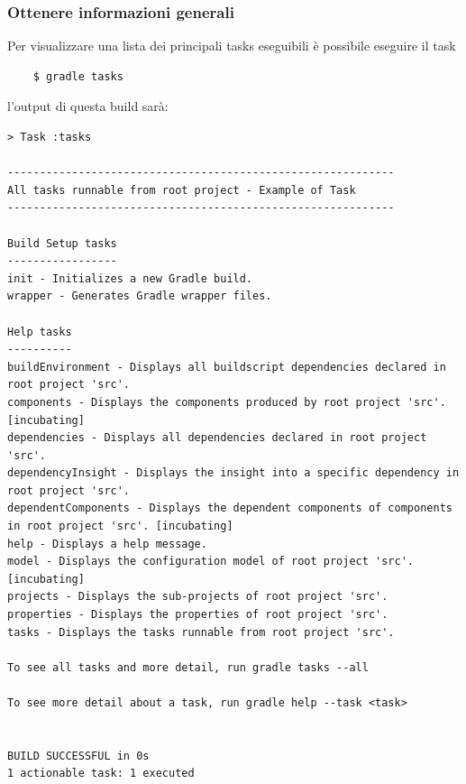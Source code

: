 \subsubsection{Ottenere informazioni generali} 
Per visualizzare una lista dei principali tasks eseguibili è possibile eseguire il task \begin{verbatim}    $ gradle tasks\end{verbatim} l'output di questa build sarà:
\begin{verbatim}
> Task :tasks 

------------------------------------------------------------
All tasks runnable from root project - Example of Task
------------------------------------------------------------

Build Setup tasks
-----------------
init - Initializes a new Gradle build.
wrapper - Generates Gradle wrapper files.

Help tasks
----------
buildEnvironment - Displays all buildscript dependencies declared in root project 'src'.
components - Displays the components produced by root project 'src'. [incubating]
dependencies - Displays all dependencies declared in root project 'src'.
dependencyInsight - Displays the insight into a specific dependency in root project 'src'.
dependentComponents - Displays the dependent components of components in root project 'src'. [incubating]
help - Displays a help message.
model - Displays the configuration model of root project 'src'. [incubating]
projects - Displays the sub-projects of root project 'src'.
properties - Displays the properties of root project 'src'.
tasks - Displays the tasks runnable from root project 'src'.

To see all tasks and more detail, run gradle tasks --all

To see more detail about a task, run gradle help --task <task>


BUILD SUCCESSFUL in 0s
1 actionable task: 1 executed
\end{verbatim}

